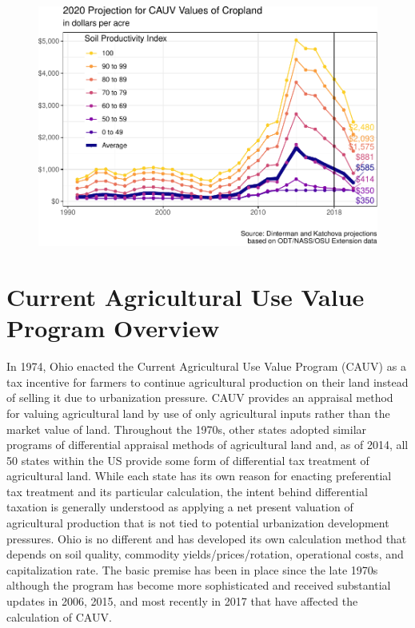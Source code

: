 \documentclass[]{article}
\begin{document}
\begin{figure}[H]
\includegraphics[width=1\linewidth]{4-projections-2019-2020_files/figure-latex/exp-trend-2020-1} \caption{\label{fig:exp-trend-2020}}\label{fig:exp-trend-2020}
\end{figure}

\newpage

\hypertarget{current-agricultural-use-value-program-overview}{%
\section{Current Agricultural Use Value Program
Overview}\label{current-agricultural-use-value-program-overview}}

In 1974, Ohio enacted the Current Agricultural Use Value Program (CAUV)
as a tax incentive for farmers to continue agricultural production on
their land instead of selling it due to urbanization pressure. CAUV
provides an appraisal method for valuing agricultural land by use of
only agricultural inputs rather than the market value of land.
Throughout the 1970s, other states adopted similar programs of
differential appraisal methods of agricultural land and, as of 2014, all
50 states within the US provide some form of differential tax treatment
of agricultural land. While each state has its own reason for enacting
preferential tax treatment and its particular calculation, the intent
behind differential taxation is generally understood as applying a net
present valuation of agricultural production that is not tied to
potential urbanization development pressures. Ohio is no different and
has developed its own calculation method that depends on soil quality,
commodity yields/prices/rotation, operational costs, and capitalization
rate. The basic premise has been in place since the late 1970s although
the program has become more sophisticated and received substantial
updates in 2006, 2015, and most recently in 2017 that have affected the
calculation of CAUV.
\end{document}
